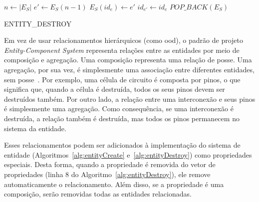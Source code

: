 \begin{algorithm} [ht]
  \LinesNumbered
         $n \gets |E_S|$\;
         $e' \gets E_S(n-1)$\;
         $E_S(id_e) \gets e'$\;
         $id_{e'} \gets id_e$\;
         $POP\_BACK(E_S)$\;
         \;
    \caption{ENTITY\_DESTROY}
    \label{alg:entityDestroy}
  \end{algorithm}

  Em vez de usar relacionamentos hierárquicos (como \ac{ood}), o padrão de projeto \textit{Entity-Component System} representa relações entre as entidades por meio de composição e agregação. Uma composição representa uma relação de posse. Uma agregação, por sua vez, é simplesmente uma associação entre diferentes entidades, sem posse~\cite{gamma1995design}.
  Por exemplo, uma célula de circuito é composta por pinos, o que significa que, quando a célula é destruída, todos os seus pinos devem ser destruídos também. Por outro lado, a relação entre uma interconexão e seus pinos é simplesmente uma agregação. Como consequência, se uma interconexão é destruída, a relação também é destruída, mas todos os pinos permanecem no sistema da entidade.

  Esses relacionamentos podem ser adicionados à implementação do sistema de entidade (Algoritmos~\ref{alg:entityCreate} e~\ref{alg:entityDestroy}) como propriedades especiais. Desta forma, quando a propriedade é removida do vetor de propriedades (linha $ 8 $ do Algoritmo~\ref{alg:entityDestroy}), ele remove automaticamente o relacionamento. Além disso, se a propriedade é uma composição, serão removidas todas as entidades relacionadas.


